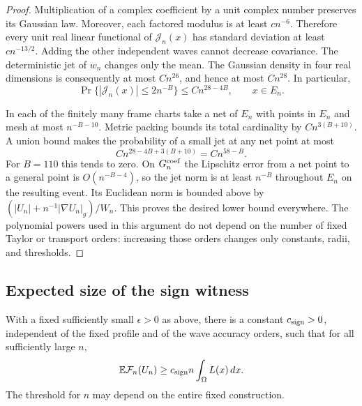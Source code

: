 \begin{proof}
Multiplication of a complex coefficient by a unit complex number
preserves its Gaussian law.  Moreover, each factored modulus is at
least $cn^{-6}$.  Therefore every unit real linear functional of
$\mathcal J_n(x)$ has standard deviation at least $cn^{-13/2}$.
Adding the other independent waves cannot decrease covariance.
The deterministic jet of $w_n$ changes only the mean.  The Gaussian
density in four real dimensions is consequently at most $Cn^{26}$,
and hence at most $Cn^{28}$.  In particular,
\[
 \Pr\{ |\mathcal J_n(x)|\le2n^{-B}\}
       \le Cn^{28-4B},\qquad x\in E_n.
\]

In each of the finitely many frame charts take a net of $E_n$ with
points in $E_n$ and mesh at most $n^{-B-10}$.  Metric packing bounds
its total cardinality by $Cn^{3(B+10)}$.  A union bound makes the
probability of a small jet at any net point at most
\[
 Cn^{28-4B+3(B+10)}=Cn^{58-B}.
\]
For $B=110$ this tends to zero.  On $G_n^{\rm coef}$ the Lipschitz
error from a net point to a general point is $O(n^{-B-4})$, so the
jet norm is at least $n^{-B}$ throughout $E_n$ on the resulting
event.  Its Euclidean norm is bounded above by
$(|U_n|+n^{-1}|\nabla U_n|_g)/W_n$.  This proves the desired lower
bound everywhere.  The polynomial powers used in this argument do
not depend on the number of fixed Taylor or transport orders:
increasing those orders changes only constants, radii, and thresholds.
\end{proof}

\subsection{Expected size of the sign witness}

\begin{lemma}
\label{lem:wave-sign-expectation}
With a fixed sufficiently small $\epsilon>0$ as above, there is a
constant $c_{\rm sign}>0$, independent of the fixed profile and of
the wave accuracy orders, such that for all sufficiently large $n$,
\begin{equation}
 \mathbb E\mathcal F_n(U_n)
       \ge c_{\rm sign} n\int_\Omega L(x)\,dx.
 \label{eq:sign-expectation-lower}
\end{equation}
The threshold for $n$ may depend on the entire fixed construction.
\end{lemma}


